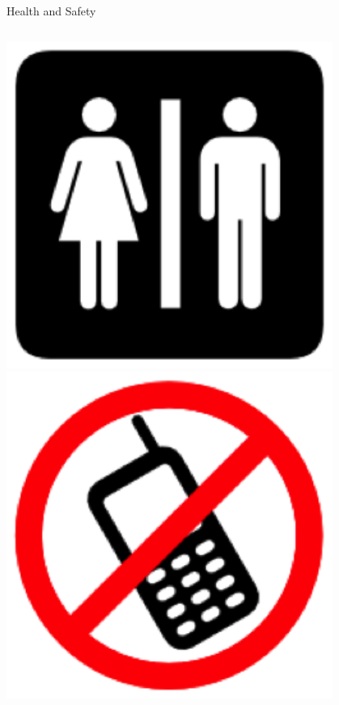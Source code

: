\begin{frame}{Health and Safety}
\begin{columns}[c]
\begin{column}{0.33\textwidth}
\begin{center}
\includegraphics[width=0.8\textwidth,height=0.5\textheight,keepaspectratio]{imgs/health-safety-3.png}\\
\includegraphics[width=0.8\textwidth,height=0.5\textheight,keepaspectratio]{imgs/health-safety-6.png}
\end{center}
\end{column}
\end{columns}
\end{frame}

